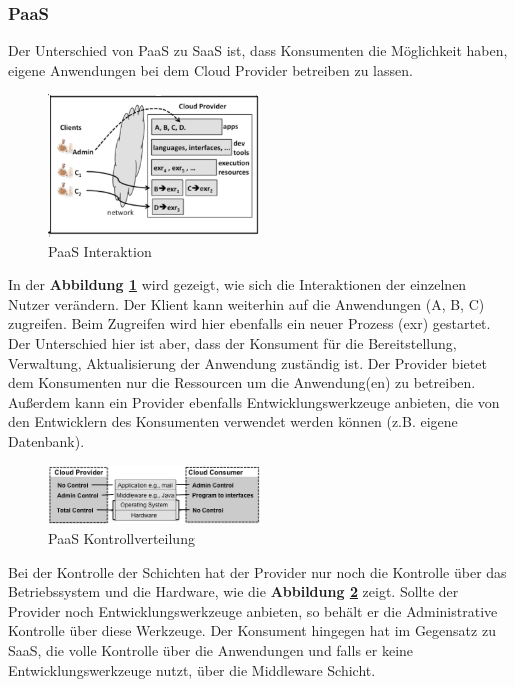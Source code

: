 \subsubsection{PaaS}
Der Unterschied von PaaS zu SaaS ist, dass Konsumenten die Möglichkeit haben, eigene Anwendungen bei dem Cloud Provider betreiben zu lassen.
\begin{figure}[h]
    \centering
	\includegraphics[width=0.5\textwidth]{Images/PaaSInteraction}
	\caption{PaaS Interaktion \cite{Badger}}
	\label{PaaSInteration}
\end{figure}
In der \textbf{Abbildung \ref{PaaSInteration}} wird gezeigt, wie sich die Interaktionen der einzelnen Nutzer verändern.
Der Klient kann weiterhin auf die Anwendungen (A, B, C) zugreifen. Beim Zugreifen wird hier ebenfalls ein neuer Prozess (exr) gestartet. Der Unterschied hier ist aber, dass
der Konsument für die Bereitstellung, Verwaltung, Aktualisierung der Anwendung zuständig ist. Der Provider bietet dem Konsumenten nur die Ressourcen um die Anwendung(en) zu betreiben.
Außerdem kann ein Provider ebenfalls Entwicklungswerkzeuge anbieten, die von den Entwicklern des Konsumenten verwendet werden können (z.B. eigene Datenbank).
\begin{figure}[h]
    \centering
	\includegraphics[width=0.5\textwidth]{Images/PaaSControl}
	\caption{PaaS Kontrollverteilung \cite{Badger}}
	\label{PaaSControl}
\end{figure}
Bei der Kontrolle der Schichten hat der Provider nur noch die Kontrolle über das Betriebssystem und die Hardware, wie die \textbf{Abbildung \ref{PaaSControl}} zeigt.
Sollte der Provider noch Entwicklungswerkzeuge anbieten, so behält er die Administrative Kontrolle über diese Werkzeuge. Der Konsument hingegen hat im Gegensatz zu SaaS,
die volle Kontrolle über die Anwendungen und falls er keine Entwicklungswerkzeuge nutzt, über die Middleware Schicht. \cite{Badger}

